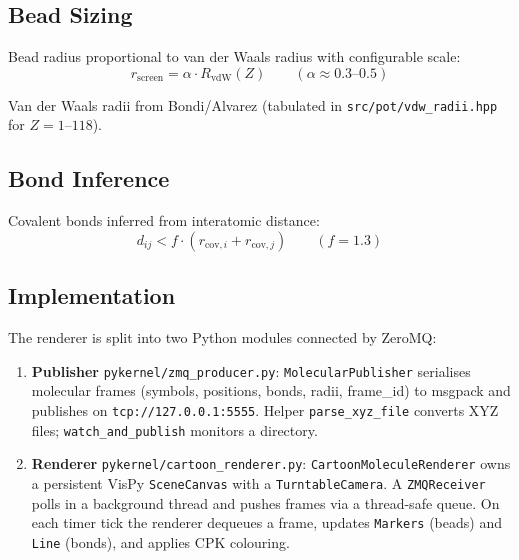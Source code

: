 \documentclass[11pt,a4paper]{article}
\begin{document}
\subsection{Bead Sizing}

Bead radius proportional to van der Waals radius with configurable scale:
\begin{equation}
  r_{\text{screen}} = \alpha \cdot R_{\text{vdW}}(Z)
  \qquad (\alpha \approx 0.3\text{--}0.5)
\end{equation}

Van der Waals radii from Bondi/Alvarez (tabulated in
\texttt{src/pot/vdw\_radii.hpp} for $Z = 1\text{--}118$).

\subsection{Bond Inference}

Covalent bonds inferred from interatomic distance:
\begin{equation}
  d_{ij} < f \cdot (r_{\text{cov},i} + r_{\text{cov},j})
  \qquad (f = 1.3)
  \label{eq:bondinfer}
\end{equation}

\subsection{Implementation}

The renderer is split into two Python modules connected by ZeroMQ:

\begin{enumerate}
  \item \textbf{Publisher} \texttt{pykernel/zmq\_producer.py}:
        \texttt{MolecularPublisher} serialises molecular frames (symbols,
        positions, bonds, radii, frame\_id) to msgpack and publishes on
        \texttt{tcp://127.0.0.1:5555}.  Helper \texttt{parse\_xyz\_file}
        converts XYZ files; \texttt{watch\_and\_publish} monitors a
        directory.
  \item \textbf{Renderer} \texttt{pykernel/cartoon\_renderer.py}:
        \texttt{CartoonMoleculeRenderer} owns a persistent VisPy
        \texttt{SceneCanvas} with a \texttt{TurntableCamera}.  A
        \texttt{ZMQReceiver} polls in a background thread and pushes
        frames via a thread-safe queue.  On each timer tick the renderer
        dequeues a frame, updates \texttt{Markers} (beads) and
        \texttt{Line} (bonds), and applies CPK colouring.
\end{enumerate}
\end{document}
